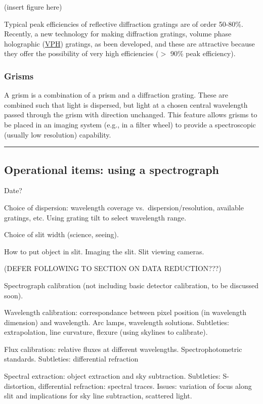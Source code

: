 \documentclass[12pt]{article}
\begin{document}
(insert figure here)

Typical peak efficiencies of reflective diffraction gratings are of
order 50-80\%. Recently, a new technology for making diffraction
gratings, volume phase holographic
(\href{http://www.kosi.com/Holographic_Gratings/vph_ht_overview.php}
{VPH}) gratings, as been developed,
and these are attractive because they offer the possibility of very
high efficiencies ($>$ 90\% peak efficiency).

\subsubsection{Grisms}

A grism is a combination of a prism and a diffraction grating. These
are combined such that light is dispersed, but light at a chosen
central wavelength passed through the grism with direction unchanged.
This feature allows grisms to be placed in an imaging system (e.g., in
a filter wheel) to provide a spectroscopic (usually low resolution)
capability.

\rule{\textwidth}{0.4pt}
\subsection{Operational items: using a spectrograph}
{\small\hfill\textcolor{date}{Date?}}

Choice of dispersion: wavelength coverage vs.\ dispersion/resolution,
available gratings, etc. Using grating tilt to select wavelength
range.

Choice of slit width (science, seeing).

How to put object in slit. Imaging the slit. Slit viewing cameras.

(DEFER FOLLOWING TO SECTION ON DATA REDUCTION???)

Spectrograph calibration (not including basic detector calibration, to
be discussed soon).

Wavelength calibration: correspondance between pixel position (in
wavelength dimension) and wavelength. Arc lamps, wavelength solutions.
Subtleties: extrapolation, line curvature, flexure (using skylines to
calibrate).

Flux calibration: relative fluxes at different wavelengths.
Spectrophotometric standards. Subtleties: differential refraction

Spectral extraction: object extraction and sky subtraction.
Subtleties: S-distortion, differential refraction: spectral traces.
Issues: variation of focus along slit and implications for sky line
subtraction, scattered light.
\end{document}
